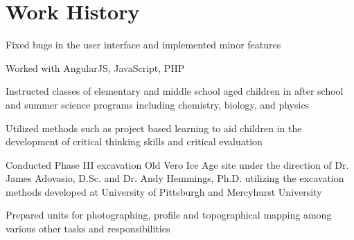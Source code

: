 \documentclass[letterpaper]{resume}
\begin{document}
\section{Work History}

\begin{compactitem}
\item Fixed bugs in the user interface and implemented minor features
\item Worked with AngularJS, JavaScript, PHP
\end{compactitem}

\begin{compactitem}
\item Instructed classes of elementary and middle school aged children in after school and summer science programs including chemistry, biology, and physics
\item Utilized methods such as project based learning to aid children in the development of critical thinking skills and critical evaluation
\end{compactitem}

\begin{compactitem}
\item Conducted Phase III excavation Old Vero Ice Age site under the direction of Dr. James Adovasio, D.Sc. and Dr. Andy Hemmings, Ph.D. utilizing the excavation methods developed at University of Pittsburgh and Mercyhurst University
\item Prepared units for photographing, profile and topographical mapping among various other tasks and responsibilities
\end{compactitem}
\end{document}

